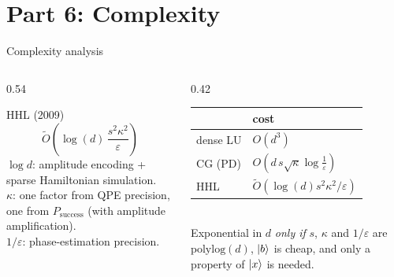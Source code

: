 \documentclass[aspectratio=169,11pt]{beamer}
\begin{document}
\section{Part 6: Complexity}
\begin{frame}{Complexity analysis}
  \begin{columns}[T]
    \begin{column}{0.54\textwidth}
      \begin{block}{HHL (2009)}
        \[ \tilde O\!\left(\log(d)\,\frac{s^2\kappa^2}{\varepsilon}\right) \]
        $\log d$: amplitude encoding + sparse Hamiltonian simulation.\\
        $\kappa$: one factor from QPE precision, one from $P_{\text{success}}$ (with amplitude amplification).\\
        $1/\varepsilon$: phase-estimation precision.
      \end{block}
    \end{column}
    \begin{column}{0.42\textwidth}
      \small
      \begin{tabular}{ll}
        \toprule & cost\\ \midrule
        dense LU & $O(d^3)$\\
        CG (PD) & $O(d\,s\sqrt\kappa\log\frac1\varepsilon)$\\
        HHL & $\tilde O(\log(d)s^2\kappa^2/\varepsilon)$\\ \bottomrule
      \end{tabular}\\[2mm]
      Exponential in $d$ \emph{only if} $s$, $\kappa$ and $1/\varepsilon$ are $\mathrm{polylog}(d)$, $\ket b$ is cheap, and only a property of $\ket x$
      is needed.
    \end{column}
  \end{columns}
\end{frame}
\end{document}
